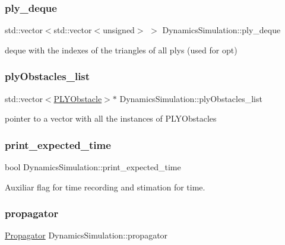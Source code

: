 \subsubsection{\texorpdfstring{ply\+\_\+deque}{ply\_deque}}
{\footnotesize\ttfamily std\+::vector$<$std\+::vector$<$unsigned$>$ $>$ Dynamics\+Simulation\+::ply\+\_\+deque}

deque with the indexes of the triangles of all ply\textquotesingle{}s (used for opt) \mbox{\label{class_dynamics_simulation_a830b3e0aa0ce95720ea0a8180e2cffec}} 
\subsubsection{\texorpdfstring{ply\+Obstacles\+\_\+list}{plyObstacles\_list}}
{\footnotesize\ttfamily std\+::vector$<$\hyperlink{class_p_l_y_obstacle}{P\+L\+Y\+Obstacle}$>$$\ast$ Dynamics\+Simulation\+::ply\+Obstacles\+\_\+list}

pointer to a vector with all the instances of P\+L\+Y\+Obstacles \mbox{\label{class_dynamics_simulation_a8742da6be78261e71b9b8cd4de0df488}} 
\subsubsection{\texorpdfstring{print\+\_\+expected\+\_\+time}{print\_expected\_time}}
{\footnotesize\ttfamily bool Dynamics\+Simulation\+::print\+\_\+expected\+\_\+time}

Auxiliar flag for time recording and stimation for time. \mbox{\label{class_dynamics_simulation_a62f78ae3e723206d16f1528e344ab1e9}} 
\subsubsection{\texorpdfstring{propagator}{propagator}}
{\footnotesize\ttfamily \hyperlink{class_propagator}{Propagator} Dynamics\+Simulation\+::propagator}

